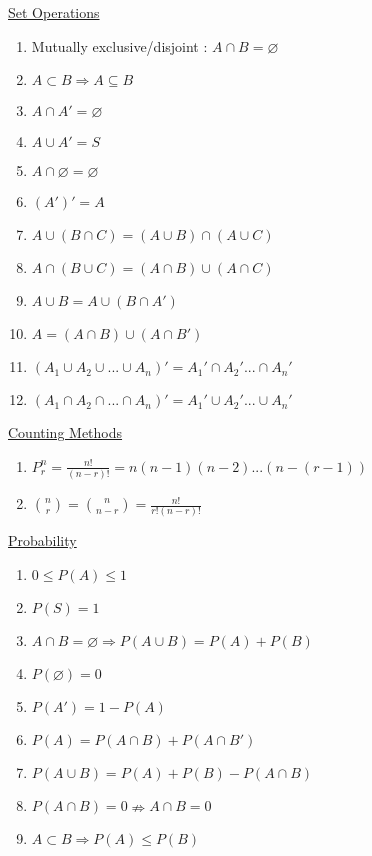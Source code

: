 \documentclass[a4paper,1pt,landscape]{article}
\begin{document}
\raggedright
\begin{multicols}{3}


\setlength{\columnseprule}{0.25pt}
\setlength{\premulticols}{1pt}
\setlength{\postmulticols}{1pt}
\setlength{\multicolsep}{1pt}
\setlength{\columnsep}{2pt}

\underline{Set Operations}
\begin{enumerate}
\item Mutually exclusive/disjoint : $A \cap B = \varnothing$
\item $A \subset B \Rightarrow A\subseteq B$
\item $A \cap A' = \varnothing$
\item $A \cup A' = S$
\item $A\cap \varnothing = \varnothing$
\item $(A')' = A$
\item $A\cup (B\cap C) = (A\cup B)\cap (A\cup C)$
\item $A\cap (B\cup C) = (A\cap B)\cup (A\cap C)$
\item $A\cup B = A \cup (B\cap A')$
\item $A = (A\cap B)\cup (A\cap B')$
\item $(A_1 \cup A_2 \cup ... \cup A_n)' = A_1' \cap A_2'... \cap A_n'$
\item $(A_1 \cap A_2 \cap ... \cap A_n)' = A_1' \cup A_2'... \cup A_n'$
\end{enumerate}

\underline{Counting Methods}
\begin{enumerate}
\item $P_r^n = \frac{n!}{(n-r)!}=n(n-1)(n-2)...(n-(r-1))$
\item $\binom{n}{r} =\binom{n}{n-r}= \frac{n!}{r!(n-r)!}$
\end{enumerate}

\underline{Probability}
\begin{enumerate}
\item $0 \leq P(A) \leq 1$
\item $P(S) = 1$
\item $A\cap B = \varnothing \Rightarrow P(A\cup B) = P(A) + P(B)$
\item $P(\varnothing) = 0$
\item $P(A') = 1 - P(A)$
\item $P(A) = P(A\cap B) + P(A\cap B')$
\item $P(A\cup B) = P(A) + P(B) - P(A\cap B)$
\item $P(A\cap B) = 0 \nRightarrow A \cap B = 0$
\item $A \subset B \Rightarrow P(A) \leq P(B)$
\end{enumerate}


\end{multicols}
\end{document}
